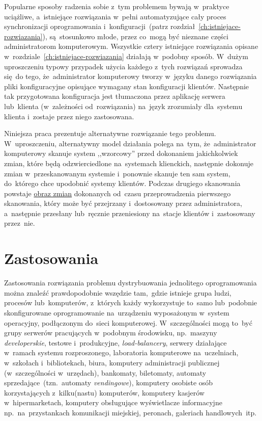 \documentclass[thesis]{subfiles}
\begin{document}
Popularne sposoby radzenia sobie z~tym problemem bywają w~praktyce uciążliwe, a~istniejące rozwiązania w~pełni automatyzujące cały proces synchronizacji oprogramowania i~konfiguracji~(patrz rozdział~\ref{ch:istniejace-rozwiazania}), są~stosunkowo młode, przez co~mogą być nieznane części administratorom komputerowym. Wszystkie cztery istniejące rozwiązania opisane w~rozdziale~\ref{ch:istniejace-rozwiazania} działają w~podobny sposób. W~dużym uproszczeniu typowy przypadek użycia każdego z~tych rozwiązań sprowadza się~do tego, że~administrator komputerowy tworzy w~języku danego rozwiązania pliki konfiguracyjne opisujące wymagany stan konfiguracji klientów. Następnie tak przygotowana konfiguracja jest tłumaczona przez aplikację serwera lub~klienta (w~zależności od~rozwiązania) na~język zrozumiały dla~systemu klienta i~zostaje przez niego zastosowana.

Niniejsza praca prezentuje alternatywne rozwiązanie tego problemu. W~uproszczeniu, alternatywny model działania polega na~tym, że~administrator komputerowy skanuje system ,,wzorcowy'' przed dokonaniem jakichkolwiek zmian, które będą odzwierciedlone na~systemach klienckich, następnie dokonuje zmian w~przeskanowanym systemie i~ponownie skanuje ten sam system, do~którego chce upodobnić systemy klientów. Podczas drugiego skanowania powstaje \hyperref[sec:obraz-zmian-konfiguracji]{obraz zmian} dokonanych od~czasu przeprowadzenia pierwszego skanowania, który może być przejrzany i~dostosowany przez administratora, a~następnie przesłany lub~ręcznie przeniesiony na~stacje klientów i~zastosowany przez~nie.


\section{Zastosowania}

Zastosowania rozwiązania problemu dystrybuowania jednolitego oprogramowania można znaleźć prawdopodobnie wszędzie tam,~gdzie istnieje grupa ludzi, procesów lub~komputerów, z~których każdy wykorzystuje to~samo lub~podobnie skonfigurowane oprogramowanie na~urządzeniu wyposażonym w~system operacyjny, podłączonym do~sieci komputerowej. W~szczególności mogą to~być grupy serwerów pracujących w~podobnym środowisku, np.~maszyny \emph{developerskie}, testowe i~produkcyjne, \emph{load-balancery}, serwery działające w~ramach systemu rozproszonego, laboratoria komputerowe na~uczelniach, w~szkołach i~bibliotekach, biura, komputery administracji publicznej (w~szczególności w~urzędach), bankomaty, biletomaty, automaty sprzedające~(tzn.~automaty \emph{vendingowe}), komputery osobiste osób korzystających z~kilku(nastu) komputerów, komputery kasjerów w~hipermarketach, komputery obsługujące wyświetlacze informacyjne np.~na~przystankach komunikacji miejskiej, peronach, galeriach handlowych~itp.
\end{document}
